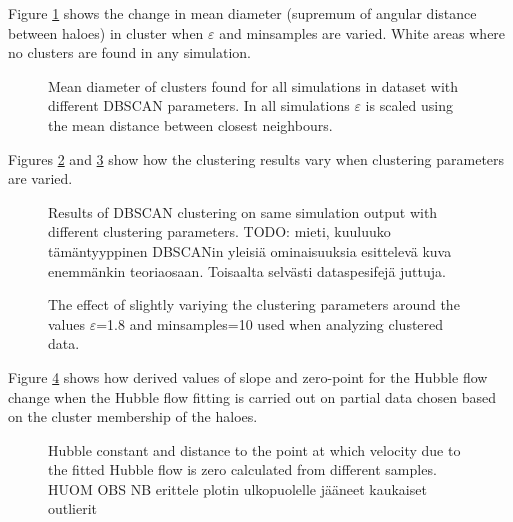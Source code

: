 \documentclass[english, oneside]{HYgradu}
\begin{document}
\reversemarginpar
{}
Figure \ref{fig:clusterdiameter} shows the change in mean diameter (supremum of angular distance between haloes) in cluster when $\varepsilon$ and minsamples are varied. White areas where no clusters are found in any simulation.

\begin{figure}
    \centering
    
    \caption{Mean diameter of clusters found for all simulations in dataset with different DBSCAN parameters. In all simulations $\varepsilon$ is scaled using the mean distance between closest neighbours.}\label{fig:clusterdiameter}
\end{figure}

\reversemarginpar
{}
Figures \ref{fig:clusteringExamples} and \ref{fig:clusteringvariations} show how the clustering results vary when clustering parameters are varied.

\begin{figure}
    \centering
    
    \caption{Results of DBSCAN clustering on same simulation output with different clustering parameters. TODO: mieti, kuuluuko tämäntyyppinen DBSCANin yleisiä ominaisuuksia esittelevä kuva enemmänkin teoriaosaan. Toisaalta selvästi dataspesifejä juttuja.}\label{fig:clusteringExamples}
\end{figure}

\begin{figure}
    \centering
    
    \caption{The effect of slightly variying the clustering parameters around the values $\varepsilon$=1.8 and minsamples=10 used when analyzing clustered data.}\label{fig:clusteringvariations}
\end{figure}

\reversemarginpar
{}
Figure \ref{fig:clusteredHFparameters} shows how derived values of slope and zero-point for the Hubble flow change when the Hubble flow fitting is carried out on partial data chosen based on the cluster membership of the haloes.

\begin{figure}
    \centering
    
    \caption{Hubble constant and distance to the point at which velocity due to the fitted Hubble flow is zero calculated from different samples. HUOM OBS NB erittele plotin ulkopuolelle jääneet kaukaiset outlierit}\label{fig:clusteredHFparameters}
\end{figure}
\end{document}
